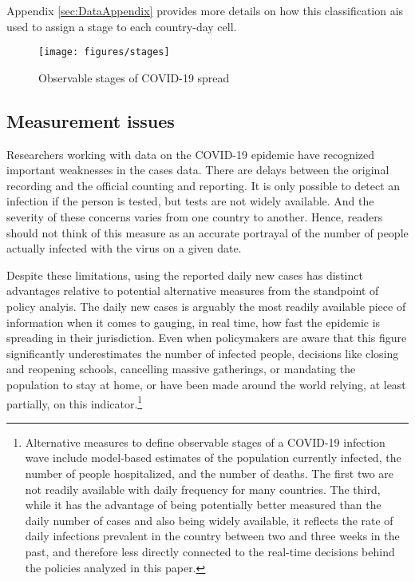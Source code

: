 \documentclass[12pt,english]{article}
\begin{document}
Appendix \ref{sec:DataAppendix} provides more details on how this classification ais used to assign a stage to each country-day cell.

\begin{figure}[H]
	\singlespacing
	\centering
	 \caption{Observable stages of COVID-19 spread}  \label{fig:stages}
	\resizebox{0.9\width}{!} {
		\begin{threeparttable}
 			  \texttt{[image: figures/stages]}
  			 \begin{tablenotes}[flushleft]\vspace*{-7bp}
			\item
			 \end{tablenotes}
  		\end{threeparttable}
 		}
  	 \onehalfspacing
\end{figure}

\subsection{Measurement issues\label{subsec:Measurement}}

Researchers working with data on the COVID-19 epidemic have recognized important weaknesses in the cases data. There are delays between the original recording and the official counting and reporting. It is only possible to detect an infection if the person is tested, but tests are not widely available. And the severity of these concerns varies from one country to another. Hence, readers should not think of this measure as an accurate portrayal of the number of people actually infected with the virus on a given date.

Despite these limitations, using the reported daily new cases has distinct advantages relative to potential alternative measures from the standpoint of policy analyis. The daily new cases is arguably the most readily available piece of information when it comes to gauging, in real time, how fast the epidemic is spreading in their jurisdiction.  Even when policymakers are aware that this figure significantly underestimates the number of infected people, decisions like closing and reopening schools, cancelling massive gatherings, or mandating the population to stay at home, or have been made around the world relying, at least partially, on this indicator.\footnote{Alternative measures to define observable stages of a COVID-19 infection wave include model-based estimates of the population currently infected, the number of people hospitalized, and the number of deaths. The first two are not readily available with daily frequency for many countries. The third, while it has the advantage of being potentially better measured than the daily number of cases and also being widely available, it reflects the rate of daily infections prevalent in the country between two and three weeks in the past, and therefore less directly connected to the real-time decisions behind the policies analyzed in this paper.}
\end{document}
